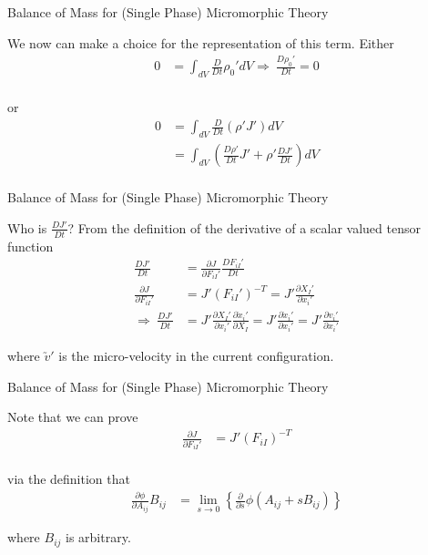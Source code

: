 \documentclass[11pt]{beamer}
\newcommand{\VEC}[1]{\utilde{#1}}
\begin{document}
\begin{frame}{Balance of Mass for (Single Phase) Micromorphic Theory}

We now can make a choice for the representation of this term. Either
\begin{align*}
0 &= \int_{dV} \frac{D}{Dt} \rho_0' dV \Rightarrow\ \frac{D \rho_0'}{Dt} = 0\\
\end{align*}

or
\begin{align*}
0 &= \int_{dV} \frac{D}{Dt} \left(\rho' J'\right) dV\\
&= \int_{dV} \left(\frac{D \rho'}{D t} J' + \rho' \frac{D J'}{D t}\right) dV\\
\end{align*}

\end{frame}

\begin{frame}{Balance of Mass for (Single Phase) Micromorphic Theory}

Who is $\frac{DJ'}{Dt}$? From the definition of the derivative of a scalar valued tensor function
\begin{align*}
\frac{D J'}{Dt} &= \frac{\partial J}{\partial F_{iI}'} \frac{D F_{iI}'}{Dt}\\
\frac{\partial J}{\partial F_{iI}'} &= J' \left(F_{iI}'\right)^{-T} = J' \frac{\partial X_I'}{\partial x_i'}\\
\Rightarrow\ \frac{DJ'}{Dt} &= J' \frac{\partial X_I'}{\partial x_i'} \frac{\partial \dot{x}_i'}{\partial X_I} = J' \frac{\partial \dot{x}_i'}{\partial x_i'} = J' \frac{\partial v_i'}{\partial x_i'}
\end{align*}

where $\VEC{v}'$ is the micro-velocity in the current configuration.

\end{frame}

\begin{frame}{Balance of Mass for (Single Phase) Micromorphic Theory}

Note that we can prove
\begin{align*}
\frac{\partial J}{\partial F_{iI}'} &= J' \left(F_{iI}\right)^{-T}\\
\end{align*}

via the definition that
\begin{align*}
\frac{\partial \phi}{\partial A_{ij}}B_{ij} &= \lim_{s \to 0} \left\{\frac{\partial}{\partial s} \phi\left(A_{ij} + s B_{ij}\right) \right\}
\end{align*}

where $B_{ij}$ is arbitrary.

\end{frame}
\end{document}
